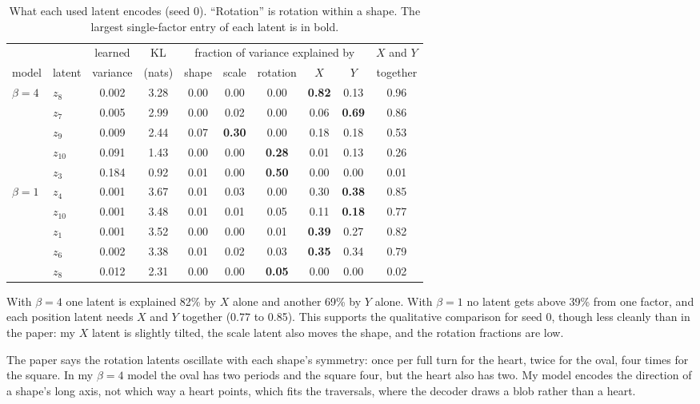 \begin{table}[H]\centering\small
  \begin{tabular}{@{}l l cc ccccc c@{}}
    \toprule
    & & learned & KL & \multicolumn{5}{c}{fraction of variance explained by} & $X$ and $Y$\\
    \cmidrule(lr){5-9}
    model & latent & variance & (nats) & shape & scale & rotation & $X$ & $Y$ & together\\
    \midrule
    $\beta=4$ & $z_8$ & 0.002 & 3.28 & 0.00 & 0.00 & 0.00 & \textbf{0.82} & 0.13 & 0.96\\
    & $z_7$ & 0.005 & 2.99 & 0.00 & 0.02 & 0.00 & 0.06 & \textbf{0.69} & 0.86\\
    & $z_9$ & 0.009 & 2.44 & 0.07 & \textbf{0.30} & 0.00 & 0.18 & 0.18 & 0.53\\
    & $z_{10}$ & 0.091 & 1.43 & 0.00 & 0.00 & \textbf{0.28} & 0.01 & 0.13 & 0.26\\
    & $z_3$ & 0.184 & 0.92 & 0.01 & 0.00 & \textbf{0.50} & 0.00 & 0.00 & 0.01\\
    \addlinespace
    $\beta=1$ & $z_4$ & 0.001 & 3.67 & 0.01 & 0.03 & 0.00 & 0.30 & \textbf{0.38} & 0.85\\
    & $z_{10}$ & 0.001 & 3.48 & 0.01 & 0.01 & 0.05 & 0.11 & \textbf{0.18} & 0.77\\
    & $z_1$ & 0.001 & 3.52 & 0.00 & 0.00 & 0.01 & \textbf{0.39} & 0.27 & 0.82\\
    & $z_6$ & 0.002 & 3.38 & 0.01 & 0.02 & 0.03 & \textbf{0.35} & 0.34 & 0.79\\
    & $z_8$ & 0.012 & 2.31 & 0.00 & 0.00 & \textbf{0.05} & 0.00 & 0.00 & 0.02\\
    \bottomrule
  \end{tabular}
  \caption{What each used latent encodes (seed 0). ``Rotation'' is rotation within a shape. The largest single-factor entry of each latent is in bold.}
  \label{tab:latents}
\end{table}

With $\beta=4$ one latent is explained 82\% by $X$ alone and another 69\% by $Y$ alone. With $\beta=1$ no latent gets above 39\% from one factor, and each position latent needs $X$ and $Y$ together (0.77 to 0.85). This supports the qualitative comparison for seed 0, though less cleanly than in the paper: my $X$ latent is slightly tilted, the scale latent also moves the shape, and the rotation fractions are low.

The paper says the rotation latents oscillate with each shape's symmetry: once per full turn for the heart, twice for the oval, four times for the square. In my $\beta=4$ model the oval has two periods and the square four, but the heart also has two. My model encodes the direction of a shape's long axis, not which way a heart points, which fits the traversals, where the decoder draws a blob rather than a heart.

